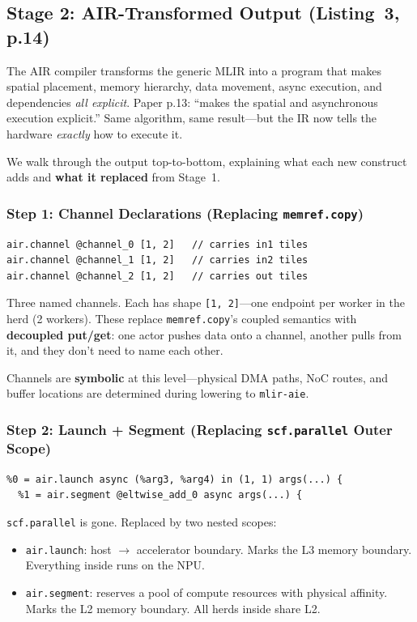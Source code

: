 \documentclass[11pt,a4paper]{article}
\begin{document}
\subsection{Stage 2: AIR-Transformed Output (Listing~3, p.14)}

The AIR compiler transforms the generic MLIR into a program that makes spatial
placement, memory hierarchy, data movement, async execution, and dependencies
\emph{all explicit}. Paper p.13: ``makes the spatial and asynchronous execution
explicit.'' Same algorithm, same result---but the IR now tells the hardware
\emph{exactly} how to execute it.

We walk through the output top-to-bottom, explaining what each new construct adds
and \textbf{what it replaced} from Stage~1.

\subsubsection{Step 1: Channel Declarations (Replacing \texttt{memref.copy})}
\begin{lstlisting}
air.channel @channel_0 [1, 2]   // carries in1 tiles
air.channel @channel_1 [1, 2]   // carries in2 tiles
air.channel @channel_2 [1, 2]   // carries out tiles
\end{lstlisting}

Three named channels. Each has shape \texttt{[1, 2]}---one endpoint per worker in the
herd (2 workers). These replace \texttt{memref.copy}'s coupled semantics with
\textbf{decoupled put/get}: one actor pushes data onto a channel, another pulls from
it, and they don't need to name each other.

Channels are \textbf{symbolic} at this level---physical DMA paths, NoC routes, and
buffer locations are determined during lowering to \texttt{mlir-aie}.

\subsubsection{Step 2: Launch + Segment (Replacing \texttt{scf.parallel} Outer Scope)}
\begin{lstlisting}
%0 = air.launch async (%arg3, %arg4) in (1, 1) args(...) {
  %1 = air.segment @eltwise_add_0 async args(...) {
\end{lstlisting}

\texttt{scf.parallel} is gone. Replaced by two nested scopes:
\begin{itemize}[leftmargin=2em]
  \item \texttt{air.launch}: host $\rightarrow$ accelerator boundary. Marks the L3
    memory boundary. Everything inside runs on the NPU.
  \item \texttt{air.segment}: reserves a pool of compute resources with physical
    affinity. Marks the L2 memory boundary. All herds inside share L2.
\end{itemize}
\end{document}
